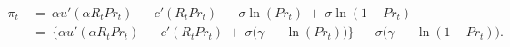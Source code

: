 \begin{equation}
\begin{split}
    \pi_{t} \ 
    & = \ \alpha u'(\alpha R_{t} Pr_{t}) \ - \ c'(R_{t} Pr_{t}) \ - \ \sigma \ln(Pr_{t}) \ + \ \sigma \ln(1 - Pr_{t}) \\
    & = \ \big\{ \alpha u'(\alpha R_{t} Pr_{t}) \ - \ c'(R_{t} Pr_{t}) \ + \ \sigma \big( \gamma \ - \ \ln(Pr_{t}) \big) \big\} \ - \ \sigma \big( \gamma \ - \ \ln(1 - Pr_{t}) \big).
\end{split}
\label{Equation:Social-Planners-Problem_Meaning-of-Costate-Variable}
\end{equation}